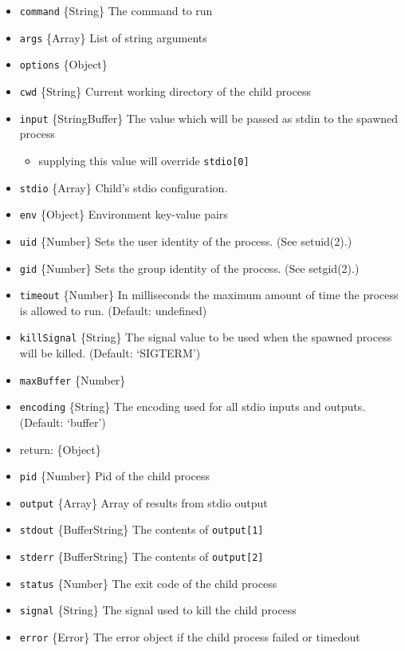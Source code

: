 \begin{itemize}
\itemsep1pt\parskip0pt
\item
  \texttt{command} \{String\} The command to run
\item
  \texttt{args} \{Array\} List of string arguments
\item
  \texttt{options} \{Object\}
\item
  \texttt{cwd} \{String\} Current working directory of the child process
\item
  \texttt{input} \{String\textbar{}Buffer\} The value which will be
  passed as stdin to the spawned process

  \begin{itemize}
  \itemsep1pt\parskip0pt
  \item
    supplying this value will override \texttt{stdio{[}0{]}}
  \end{itemize}
\item
  \texttt{stdio} \{Array\} Child's stdio configuration.
\item
  \texttt{env} \{Object\} Environment key-value pairs
\item
  \texttt{uid} \{Number\} Sets the user identity of the process. (See
  setuid(2).)
\item
  \texttt{gid} \{Number\} Sets the group identity of the process. (See
  setgid(2).)
\item
  \texttt{timeout} \{Number\} In milliseconds the maximum amount of time
  the process is allowed to run. (Default: undefined)
\item
  \texttt{killSignal} \{String\} The signal value to be used when the
  spawned process will be killed. (Default: `SIGTERM')
\item
  \texttt{maxBuffer} \{Number\}
\item
  \texttt{encoding} \{String\} The encoding used for all stdio inputs
  and outputs. (Default: `buffer')
\item
  return: \{Object\}
\item
  \texttt{pid} \{Number\} Pid of the child process
\item
  \texttt{output} \{Array\} Array of results from stdio output
\item
  \texttt{stdout} \{Buffer\textbar{}String\} The contents of
  \texttt{output{[}1{]}}
\item
  \texttt{stderr} \{Buffer\textbar{}String\} The contents of
  \texttt{output{[}2{]}}
\item
  \texttt{status} \{Number\} The exit code of the child process
\item
  \texttt{signal} \{String\} The signal used to kill the child process
\item
  \texttt{error} \{Error\} The error object if the child process failed
  or timedout
\end{itemize}

